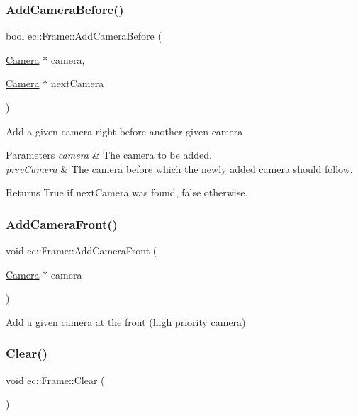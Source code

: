 \subsubsection{\texorpdfstring{Add\+Camera\+Before()}{AddCameraBefore()}}
{\footnotesize\ttfamily bool ec\+::\+Frame\+::\+Add\+Camera\+Before (\begin{DoxyParamCaption}\item[{\mbox{\hyperlink{classec_1_1_camera}{Camera}} $\ast$}]{camera,  }\item[{\mbox{\hyperlink{classec_1_1_camera}{Camera}} $\ast$}]{next\+Camera }\end{DoxyParamCaption})}

Add a given camera right before another given camera 
\begin{DoxyParams}{Parameters}
{\em camera} & The camera to be added. \\
\hline
{\em prev\+Camera} & The camera before which the newly added camera should follow. \\
\hline
\end{DoxyParams}
\begin{DoxyReturn}{Returns}
True if next\+Camera was found, false otherwise. 
\end{DoxyReturn}
\mbox{\label{classec_1_1_frame_a90fb8cd300040ea5884eb0e185385d96}} 
\subsubsection{\texorpdfstring{Add\+Camera\+Front()}{AddCameraFront()}}
{\footnotesize\ttfamily void ec\+::\+Frame\+::\+Add\+Camera\+Front (\begin{DoxyParamCaption}\item[{\mbox{\hyperlink{classec_1_1_camera}{Camera}} $\ast$}]{camera }\end{DoxyParamCaption})}

Add a given camera at the front (high priority camera) \mbox{\label{classec_1_1_frame_a9756a68f9db16a43cf23dac3f13c0672}} 
\subsubsection{\texorpdfstring{Clear()}{Clear()}}
{\footnotesize\ttfamily void ec\+::\+Frame\+::\+Clear (\begin{DoxyParamCaption}{ }\end{DoxyParamCaption})}

